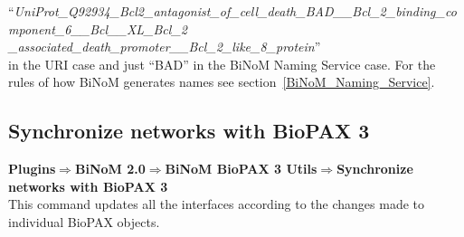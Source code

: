 “\textit{UniProt\_Q92934\_Bcl2\_antagonist\_of\_cell\_death\_BAD\_\_Bcl\_2\_binding\_component\_6\_\_Bcl\_\_XL\_Bcl\_2\\
\_associated\_death\_promoter\_\_Bcl\_2\_like\_8\_protein}”\\

in the URI case and just “BAD” in the BiNoM Naming Service case. For the rules of how BiNoM generates names see section~\ref{BiNoM_Naming_Service}.

\subsection{Synchronize networks with BioPAX 3}
\textbf{Plugins$\Rightarrow$BiNoM 2.0$\Rightarrow$BiNoM BioPAX 3 Utils$\Rightarrow$Synchronize networks with BioPAX 3}\\
This command updates all the interfaces according to the changes made to individual BioPAX objects.
